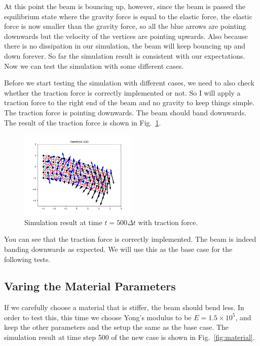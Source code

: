 \documentclass[acmtog]{acmart}
\begin{document}
At this point the beam is bouncing up, however, since the beam is passed the equilibrium state where the gravity force is equal to the elastic force, the elastic force is now smaller than the gravity force, so all the blue arrows are pointing downwards but the velocity of the vertices are pointing upwards. Also because there is no dissipation in our simulation, the beam will keep bouncing up and down forever. So far the simulation result is consistent with our expectations. Now we can test the simulation with some different cases.

Before we start testing the simulation with different cases, we need to also check whether the traction force is correctly implemented or not. So I will apply a traction force to the right end of the beam and no gravity to keep things simple. The traction force is pointing downwards. The beam should band downwards. The result of the traction force is shown in Fig.~\ref{fig:base}.

\begin{figure}[H]
  \centering
  \includegraphics[width=0.5\textwidth]{images/base.png}
  \caption{Simulation result at time $t=500\Delta t$ with traction force.}
  \label{fig:base}
\end{figure}

You can see that the traction force is correctly implemented. The beam is indeed banding downwards as expected. We will use this as the base case for the following tests.

\subsection{Varing the Material Parameters}
If we carefully choose a material that is stiffer, the beam should bend less. In order to test this, this time we choose Yong's modulus to be $E = 1.5 \times 10^5$, and keep the other parameters and the setup the same as the base case. The simulation result at time step 500 of the new case is shown in Fig.~\ref{fig:material}.
\end{document}
